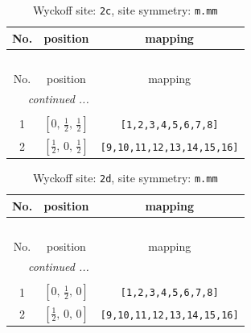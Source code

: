\documentclass[fleqn,8pt]{jsarticle}
\begin{document}
\renewcommand{\arraystretch}{1.2}
\begin{longtable}{ccc}
\caption{Wyckoff site: {\tt 2c}, site symmetry: {\tt m.mm}}
 \\
 \hline \hline
No. & position & mapping \\ \hline \endfirsthead

\multicolumn{2}{l}{\tablename\ \thetable{}} \\
 \hline \hline
No. & position & mapping \\ \hline \endhead

 \hline \hline
\multicolumn{2}{r}{\footnotesize\it continued ...} \\ \endfoot

 \hline \hline
\multicolumn{2}{r}{} \\ \endlastfoot

1 & $\left[ 0,\, \frac{1}{2},\, \frac{1}{2} \right]$ & {\tt [1,2,3,4,5,6,7,8]} \\ \hline
2 & $\left[ \frac{1}{2},\, 0,\, \frac{1}{2} \right]$ & {\tt [9,10,11,12,13,14,15,16]} \\
\end{longtable}
\renewcommand{\arraystretch}{1.2}
\begin{longtable}{ccc}
\caption{Wyckoff site: {\tt 2d}, site symmetry: {\tt m.mm}}
 \\
 \hline \hline
No. & position & mapping \\ \hline \endfirsthead

\multicolumn{2}{l}{\tablename\ \thetable{}} \\
 \hline \hline
No. & position & mapping \\ \hline \endhead

 \hline \hline
\multicolumn{2}{r}{\footnotesize\it continued ...} \\ \endfoot

 \hline \hline
\multicolumn{2}{r}{} \\ \endlastfoot

1 & $\left[ 0,\, \frac{1}{2},\, 0 \right]$ & {\tt [1,2,3,4,5,6,7,8]} \\ \hline
2 & $\left[ \frac{1}{2},\, 0,\, 0 \right]$ & {\tt [9,10,11,12,13,14,15,16]} \\
\end{longtable}
\renewcommand{\arraystretch}{1.2}
\end{document}
